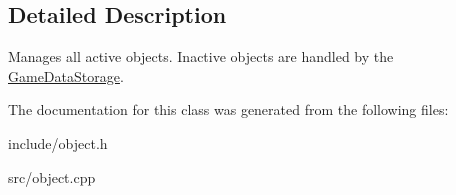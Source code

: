 \subsection{\-Detailed \-Description}
\-Manages all active objects. \-Inactive objects are handled by the \hyperlink{classGameDataStorage}{\-Game\-Data\-Storage}. 

\-The documentation for this class was generated from the following files\-:\begin{DoxyCompactItemize}
\item 
include/object.\-h\item 
src/object.\-cpp\end{DoxyCompactItemize}
